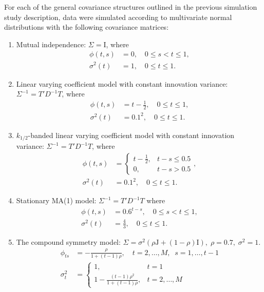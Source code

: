 
For each of the general covariance structures outlined in the previous simulation study description, data were simulated according to multivariate normal distributions with the following covariance matrices: 
\begin{enumerate} \label{simulation-model-list}
\item\label{item:cov-type-1} Mutual independence: $\Sigma = \mathrm{I}$, where 
\begin{align*}
\phi\left(t,s\right) &= 0, \quad 0 \le s < t \le 1,\\ 
\sigma^2\left(t\right) &= 1, \quad 0 \le t \le 1.
\end{align*}
\item \label{item:cov-type-2} Linear varying coefficient model with constant innovation variance: $\Sigma^{-1} = T' D^{-1} T$, where 
\begin{align*}
\phi\left(t,s\right) &= t - \frac{1}{2},  \quad 0 \le t \le 1, \\
\sigma^2\left(t\right) &= 0.1^2,  \quad 0 \le t \le 1.
\end{align*}
{}
\item \label{item:cov-type-3} $k_{1/2}$-banded linear varying coefficient model with constant innovation variance: $\Sigma^{-1} = T' D^{-1} T$, where
\begin{align*}
\phi\left(t,s\right) &= \left\{\begin{array}{ll} t - \frac{1}{2}, & t - s \le 0.5\\ 
0, & t - s > 0.5\end{array}\right.,\\
\sigma^2\left(t\right) &= 0.1^2, \quad 0 \le t \le 1.
\end{align*}
\item \label{item:cov-type-4} Stationary MA(1) model: $\Sigma^{-1} = T' D^{-1} T$ where 
\begin{align*}
\phi\left(t,s\right) &= 0.6^{t - s}, \quad 0 \le s < t \le 1,\\
\sigma^2\left(t\right) &= \frac{4}{3}, \quad 0 \le t \le 1.
\end{align*}
\item \label{item:cov-type-5} The compound symmetry model: $\Sigma = \sigma^2\left(\rho \mathrm{J} + \left(1-\rho\right)\mathrm{I}\right),\; \rho=0.7,\;\sigma^2=1$. 
\begin{align*}
\phi_{ts} &= -\frac{\rho}{1 + \left(t-1\right)\rho}, \quad t = 2, \dots, M,\;\; s = 1, \dots, t-1\\
\sigma_t^2 &= \left\{\begin{array}{ll} 1, & t = 1\\ 1 -\frac{\left(t-1\right)\rho^2}{1 + \left(t-1\right)\rho}, & t = 2, \dots, M \end{array}\right.
\end{align*}
\end{enumerate}
 



